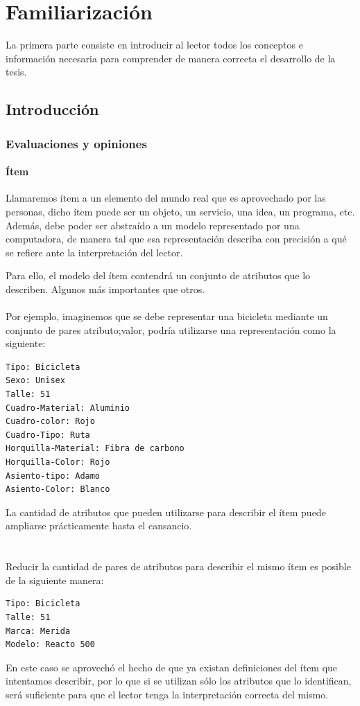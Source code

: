 \part{Familiarización}

La primera parte consiste en introducir al lector todos los conceptos e información necesaria para comprender de manera correcta 
el desarrollo de la tesis.

\chapter{Introducción}
\label{chapter:introduccion}

\section{Evaluaciones y opiniones}
\label{section:evaluaciones-cruzadas}

\subsection{Ítem}
\noindent Llamaremos ítem a un elemento del mundo real que es aprovechado por las personas, dicho ítem puede ser un objeto, un servicio, una idea, un programa, etc. Además, debe poder ser abstraído a un modelo representado por una computadora, de manera tal que esa representación describa con precisión a qué se refiere ante la interpretación del lector. 

\noindent Para ello, el modelo del ítem contendrá un conjunto de atributos que lo describen. Algunos más importantes que otros.
\\\\
Por ejemplo, imaginemos que se debe representar una bicicleta mediante un conjunto de pares atributo;valor, podría utilizarse una representación como la siguiente:
\begin{lstlisting}[frame=single] 
Tipo: Bicicleta
Sexo: Unisex
Talle: 51
Cuadro-Material: Aluminio
Cuadro-color: Rojo
Cuadro-Tipo: Ruta
Horquilla-Material: Fibra de carbono
Horquilla-Color: Rojo
Asiento-tipo: Adamo 
Asiento-Color: Blanco
\end{lstlisting}
La cantidad de atributos que pueden utilizarse para describir el ítem puede ampliarse prácticamente hasta el cansancio. 
\\\\\\
Reducir la cantidad de pares de atributos para describir el mismo ítem es posible de la siguiente manera: 
\begin{lstlisting}[frame=single] 
Tipo: Bicicleta
Talle: 51 
Marca: Merida
Modelo: Reacto 500
\end{lstlisting}
En este caso se aprovechó el hecho de que ya existan definiciones del ítem que intentamos describir, por lo que si se utilizan sólo los atributos que lo identifican, será suficiente para que el lector tenga la interpretación correcta del mismo. 
\\\\
